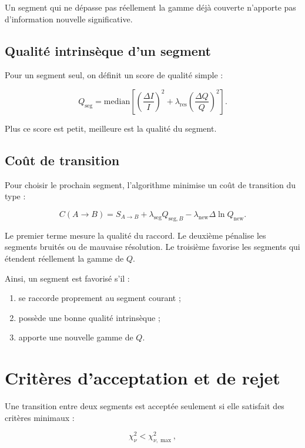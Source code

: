 \documentclass[11pt,a4paper]{article}
\begin{document}
Un segment qui ne dépasse pas réellement la gamme déjà couverte n'apporte pas
d'information nouvelle significative.

\subsection{Qualité intrinsèque d'un segment}

Pour un segment seul, on définit un score de qualité simple :

\[
    Q_{\mathrm{seg}}
    =
    \mathrm{median}
    \left[
        \left(\frac{\Delta I}{I}\right)^2
        +
        \lambda_{\mathrm{res}}
        \left(\frac{\Delta Q}{Q}\right)^2
    \right].
\]

Plus ce score est petit, meilleure est la qualité du segment.

\subsection{Coût de transition}

Pour choisir le prochain segment, l'algorithme minimise un coût de transition
du type :

\[
    C(A\rightarrow B)
    =
    S_{A\rightarrow B}
    +
    \lambda_{\mathrm{seg}} Q_{\mathrm{seg},B}
    -
    \lambda_{\mathrm{new}} \Delta\ln Q_{\mathrm{new}}.
\]

Le premier terme mesure la qualité du raccord. Le deuxième pénalise les segments
bruités ou de mauvaise résolution. Le troisième favorise les segments qui
étendent réellement la gamme de $Q$.

Ainsi, un segment est favorisé s'il :

\begin{enumerate}[leftmargin=1.5em]
    \item se raccorde proprement au segment courant ;
    \item possède une bonne qualité intrinsèque ;
    \item apporte une nouvelle gamme de $Q$.
\end{enumerate}

\section{Critères d'acceptation et de rejet}

Une transition entre deux segments est acceptée seulement si elle satisfait des
critères minimaux :

\[
    \chi^2_\nu < \chi^2_{\nu,\max},
\]
\end{document}
